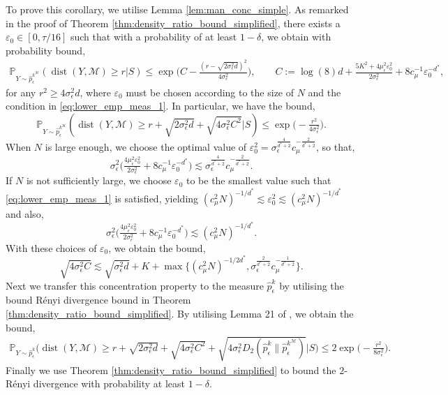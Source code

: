 \documentclass[10pt]{article}
\theoremstyle{plain}
\theoremstyle{definition}
\theoremstyle{remark}
\newcommand{\M}{{\mathcal{M}}}
\newcommand{\prob}{\mathbb{P}}
\begin{document}
To prove this corollary, we utilise Lemma \ref{lem:man_conc_simple}. As remarked in the proof of Theorem \ref{thm:density_ratio_bound_simplified}, there exists a \(\varepsilon_0 \in [0, \tau/16]\) such that with a probability of at least \(1-\delta\), we obtain with probability bound,
\begin{align*}
    \prob_{Y \sim \hat{p}^{k^\M}_\epsilon} ( \operatorname{dist}(Y, \M) \geq r|S) \leq \exp \Big ( C - \tfrac{(r-\sqrt{2 \sigma_\epsilon^2 d})^2}{4 \sigma_\epsilon^2} \Big ), \qquad C := \log(8) d + \tfrac{5K^2 + 4\mu_\epsilon^2 \varepsilon_0^2}{2\sigma_\epsilon^2} + 8 c_\mu^{-1} \varepsilon_0^{-d^*},
\end{align*}
for any \(r^2 \geq 4 \sigma_\epsilon^2 d\), where \(\varepsilon_0\) must be chosen according to the size of \(N\) and the condition in \eqref{eq:lower_emp_meas_1}. In particular, we have the bound,
\begin{equation*}
    \prob_{Y \sim \hat{p}^{k^\M}_\epsilon} ( \operatorname{dist}(Y, \M) \geq r + \sqrt{2 \sigma_\epsilon^2 d} + \sqrt{4 \sigma_\epsilon^2 C^2} | S) \leq \exp \Big ( - \tfrac{r^2}{4 \sigma_\epsilon^2} \Big ).
\end{equation*}
When \(N\) is large enough, we choose the optimal value of \(\varepsilon_0^2 = \sigma_\epsilon^{\frac{4}{d^*+2}} c_\mu^{-\frac{2}{d^*+2}}\), so that,
\begin{equation*}
    \sigma_\epsilon^2 \bigg ( \tfrac{4\mu_\epsilon^2 \varepsilon_0^2}{2\sigma_\epsilon^2} + 8 c_\mu^{-1} \varepsilon_0^{-d^*} \bigg ) \lesssim \sigma_\epsilon^{\frac{4}{d^*+2}} c_\mu^{-\frac{2}{d^*+2}}.
\end{equation*}
If \(N\) is not sufficiently large, we choose \(\varepsilon_0\) to be the smallest value such that \eqref{eq:lower_emp_meas_1} is satisfied, yielding \((c_\mu^2 N)^{-1/d^*} \lesssim \varepsilon_0^2 \lesssim (c_\mu^2 N)^{-1/d^*}\) and also,
\begin{equation*}
    \sigma_\epsilon^2 \bigg ( \tfrac{4\mu_\epsilon^2 \varepsilon_0^2}{2\sigma_\epsilon^2} + 8 c_\mu^{-1} \varepsilon_0^{-d^*} \bigg ) \lesssim (c_\mu^2 N)^{-1/d^*}.
\end{equation*}
With these choices of \(\varepsilon_0\), we obtain the bound,
\begin{equation*}
    \sqrt{4 \sigma_\epsilon^2 C} \lesssim \sqrt{\sigma_\epsilon^2 d} + K + \max\{(c_\mu^2 N)^{-1/2d^*}, \sigma_\epsilon^{\frac{2}{d^*+2}} c_\mu^{-\frac{1}{d^*+2}}\}.
\end{equation*}
Next we transfer this concentration property to the measure \(\hat{p}_\epsilon^{k}\) by utilising the bound R\'enyi divergence bound in Theorem \ref{thm:density_ratio_bound_simplified}. By utilising Lemma 21 of \cite{Chewi2022-of}, we obtain the bound,
\begin{align*}
    \prob_{Y \sim \hat{p}^{k}_\epsilon} \Big ( \operatorname{dist}(Y, \M) \geq r + \sqrt{2 \sigma_\epsilon^2 d} + \sqrt{4 \sigma_\epsilon^2 C^2} + \sqrt{4 \sigma_\epsilon^2 D_2(\hat{p}^{k}_\epsilon \| \hat{p}^{k^\M}_\epsilon)} \Big | S \Big ) \leq 2 \exp \Big ( - \tfrac{r^2}{8 \sigma_\epsilon^2} \Big ).
\end{align*}
Finally we use Theorem \ref{thm:density_ratio_bound_simplified} to bound the \(2\)-R\'{e}nyi divergence with probability at least \(1-\delta\).
\end{document}
